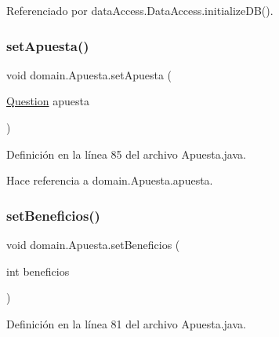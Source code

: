 Referenciado por data\+Access.\+Data\+Access.\+initialize\+D\+B().

\mbox{\label{classdomain_1_1Apuesta_add05d4c5b0aef4171628c2eaec38fe93}} 
\subsubsection{\texorpdfstring{setApuesta()}{setApuesta()}}
{\footnotesize\ttfamily void domain.\+Apuesta.\+set\+Apuesta (\begin{DoxyParamCaption}\item[{\mbox{\hyperlink{classdomain_1_1Question}{Question}}}]{apuesta }\end{DoxyParamCaption})}



Definición en la línea 85 del archivo Apuesta.\+java.


\begin{DoxyCode}{0}

\end{DoxyCode}


Hace referencia a domain.\+Apuesta.\+apuesta.

\mbox{\label{classdomain_1_1Apuesta_a98a5d5593ba08e9cdf74857c501bc1ef}} 
\subsubsection{\texorpdfstring{setBeneficios()}{setBeneficios()}}
{\footnotesize\ttfamily void domain.\+Apuesta.\+set\+Beneficios (\begin{DoxyParamCaption}\item[{int}]{beneficios }\end{DoxyParamCaption})}



Definición en la línea 81 del archivo Apuesta.\+java.


